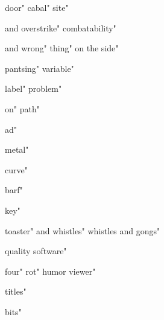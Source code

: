 

 door"
 cabal"
 site"




 and overstrike"
 combatability"

 and wrong"
 thing"
 on the side"


 pantsing"
 variable"

 label"
 problem"


 on"
 path"

 ad"

 metal"










 curve"

 barf"






 key"


 toaster"
 and whistles"
 whistles and gongs"

 quality software"








 four"
 rot"
 humor viewer"


 titles"






 bits"





